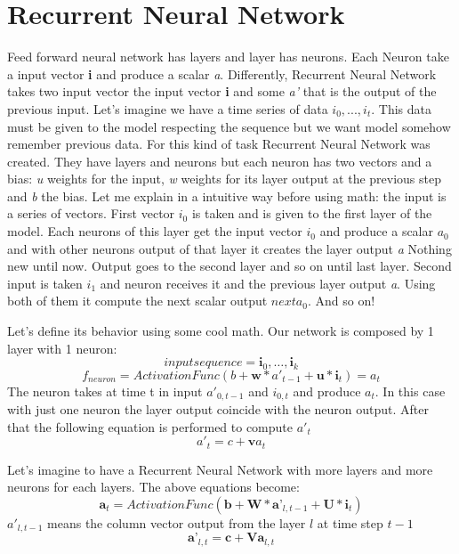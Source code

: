 \documentclass[12pt,a4paper,twoside,openright]{scrbook}
\begin{document}
\section{Recurrent Neural Network}
Feed forward neural network has layers and layer has neurons. Each Neuron take a input vector \textbf{i} and produce a scalar \textit{a}. Differently, Recurrent Neural Network takes two input vector the input vector \textbf{i} and some \textit{a'} that is the output of the previous input. Let's imagine we have a time series of data $i_0,...,i_t$. This data must be given to the model respecting the sequence but we want model somehow remember previous data. For this kind of task Recurrent Neural Network was created. They have layers and neurons but each neuron has two vectors and a bias: \textit{u} weights for the input, \textit{w} weights for its layer output at the previous step and \textit{b} the bias. Let me explain in a intuitive way before using math: the input is a series of vectors. First vector $i_0$ is taken and is given to the first layer of the model. Each neurons of this layer get the input vector $i_0$ and produce a scalar $a_0$ and with other neurons output of that layer it creates the layer output \textit{a}  Nothing new until now. Output goes to the second layer and so on until last layer. Second input is taken $i_1$ and neuron  receives it and the previous layer output \textit{a}. Using both of them it compute the next scalar output $nexta_0$. And so on! 

Let's define its behavior using some cool math. Our network is composed by 1 layer with 1 neuron:
\begin{equation}
  inputsequence= \textbf{i}_0, \ldots ,\textbf{i}_k 
\end{equation}
\begin{equation}
  f_{neuron} = ActivationFunc( b + \textbf{w}*a'_{t - 1} + \textbf{u}*\textbf{i}_t) = a_{t}
\end{equation}
The neuron takes at time t in input $a'_{0,t - 1}$ and $i_{0,t}$ and produce $a_{t}$. In this case with just one neuron the layer output coincide with the neuron output. After that the following equation is performed to compute $a'_t$
\begin{equation}
a'_t = c + \textbf{v}a_t
\end{equation}

Let's imagine to have a Recurrent Neural Network with more layers and more neurons for each layers. The above equations become:
\begin{equation}
\textbf{a}_t = ActivationFunc(\textbf{b} + \textbf{W}*\textbf{a'}_{l,t-1} + \textbf{U}*\textbf{i}_t)
\end{equation}
$a'_{l,t-1}$ means the column vector output from the layer $l$ at time step $t-1$
\begin{equation}
\textbf{a'}_{l,t} = \textbf{c} + \textbf{V}\textbf{a}_{l,t} 
\end{equation} 
\end{document}
